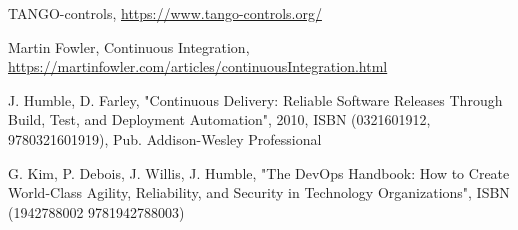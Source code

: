 %
	{\printbibliography}%
	{%
	
	\begin{thebibliography}{9} %
	
		TANGO-controls,
		\url{https://www.tango-controls.org/}
	
		Martin Fowler, Continuous Integration,
		\url{https://martinfowler.com/articles/continuousIntegration.html}
		
	    J. Humble, D. Farley, "Continuous Delivery: Reliable Software Releases Through Build, Test, and Deployment Automation",
	    2010, ISBN (0321601912, 9780321601919), Pub. Addison-Wesley Professional
	
	    G. Kim, P. Debois, J. Willis, J. Humble, "The DevOps Handbook: How to Create World-Class Agility, Reliability, and Security in Technology Organizations", ISBN (1942788002 9781942788003)




	\end{thebibliography}

	





}
